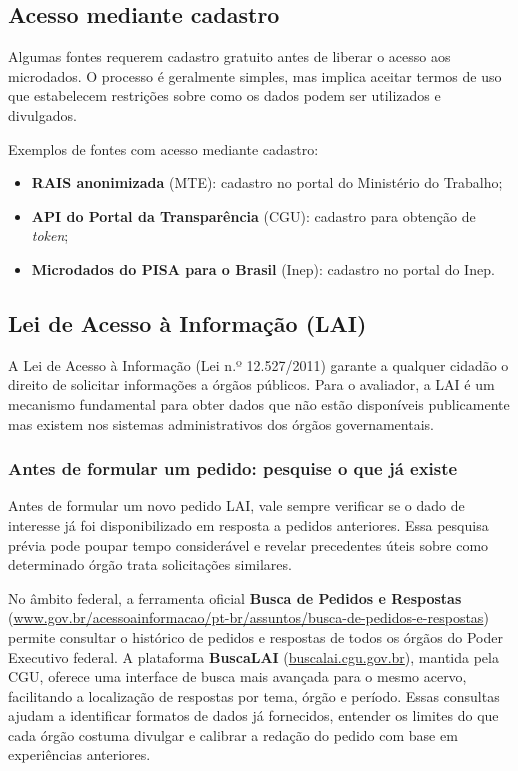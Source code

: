 \subsection{Acesso mediante cadastro}

Algumas fontes requerem cadastro gratuito antes de liberar o acesso aos microdados. O processo é geralmente simples, mas implica aceitar termos de uso que estabelecem restrições sobre como os dados podem ser utilizados e divulgados.

Exemplos de fontes com acesso mediante cadastro:
\begin{itemize}
  \item \textbf{RAIS anonimizada} (MTE): cadastro no portal do Ministério do Trabalho;
  \item \textbf{API do Portal da Transparência} (CGU): cadastro para obtenção de \textit{token};
  \item \textbf{Microdados do PISA para o Brasil} (Inep): cadastro no portal do Inep.
\end{itemize}

\subsection{Lei de Acesso à Informação (LAI)}

A Lei de Acesso à Informação (Lei n.º 12.527/2011) garante a qualquer cidadão o direito de solicitar informações a órgãos públicos. Para o avaliador, a LAI é um mecanismo fundamental para obter dados que não estão disponíveis publicamente mas existem nos sistemas administrativos dos órgãos governamentais.

\subsubsection{Antes de formular um pedido: pesquise o que já existe}

Antes de formular um novo pedido LAI, vale sempre verificar se o dado de interesse já foi disponibilizado em resposta a pedidos anteriores. Essa pesquisa prévia pode poupar tempo considerável e revelar precedentes úteis sobre como determinado órgão trata solicitações similares.

No âmbito federal, a ferramenta oficial \textbf{Busca de Pedidos e Respostas} (\url{www.gov.br/acessoainformacao/pt-br/assuntos/busca-de-pedidos-e-respostas}) permite consultar o histórico de pedidos e respostas de todos os órgãos do Poder Executivo federal. A plataforma \textbf{BuscaLAI} (\url{buscalai.cgu.gov.br}), mantida pela CGU, oferece uma interface de busca mais avançada para o mesmo acervo, facilitando a localização de respostas por tema, órgão e período. Essas consultas ajudam a identificar formatos de dados já fornecidos, entender os limites do que cada órgão costuma divulgar e calibrar a redação do pedido com base em experiências anteriores.

